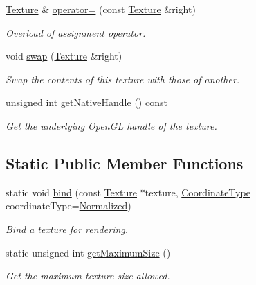 \begin{DoxyCompactItemize}
\mbox{\hyperlink{classsf_1_1_texture}{Texture}} \& \mbox{\hyperlink{classsf_1_1_texture_a80a089b6b19bb09b83012d5f0e6af9ba}{operator=}} (const \mbox{\hyperlink{classsf_1_1_texture}{Texture}} \&right)
\begin{DoxyCompactList}\small\item\em Overload of assignment operator. \end{DoxyCompactList}\item 
void \mbox{\hyperlink{classsf_1_1_texture_a9243470c64b7ff0d231e00663e495798}{swap}} (\mbox{\hyperlink{classsf_1_1_texture}{Texture}} \&right)
\begin{DoxyCompactList}\small\item\em Swap the contents of this texture with those of another. \end{DoxyCompactList}\item 
unsigned int \mbox{\hyperlink{classsf_1_1_texture_a674b632608747bfc27b53a4935c835b0}{get\+Native\+Handle}} () const
\begin{DoxyCompactList}\small\item\em Get the underlying Open\+GL handle of the texture. \end{DoxyCompactList}\end{DoxyCompactItemize}
\subsection*{Static Public Member Functions}
\begin{DoxyCompactItemize}
\item 
static void \mbox{\hyperlink{classsf_1_1_texture_ae9a4274e7b95ebf7244d09c7445833b0}{bind}} (const \mbox{\hyperlink{classsf_1_1_texture}{Texture}} $\ast$texture, \mbox{\hyperlink{classsf_1_1_texture_aa6fd3bbe3c334b3c4428edfb2765a82e}{Coordinate\+Type}} coordinate\+Type=\mbox{\hyperlink{classsf_1_1_texture_aa6fd3bbe3c334b3c4428edfb2765a82ea69d6228950882e4d68be4ba4dbe7df73}{Normalized}})
\begin{DoxyCompactList}\small\item\em Bind a texture for rendering. \end{DoxyCompactList}\item 
static unsigned int \mbox{\hyperlink{classsf_1_1_texture_a0bf905d487b104b758549c2e9e20a3fb}{get\+Maximum\+Size}} ()
\begin{DoxyCompactList}\small\item\em Get the maximum texture size allowed. \end{DoxyCompactList}\end{DoxyCompactItemize}
